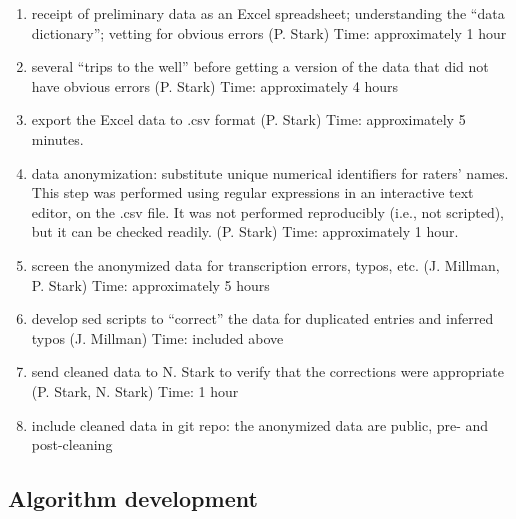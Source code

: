 \documentclass[]{article}
\begin{document}
  \begin{enumerate}
  \def\labelenumii{\roman{enumii}.}
  \itemsep1pt\parskip0pt
  \item
    receipt of preliminary data as an Excel spreadsheet; understanding
    the ``data dictionary''; vetting for obvious errors (P. Stark) Time:
    approximately 1 hour
  \item
    several ``trips to the well'' before getting a version of the data
    that did not have obvious errors (P. Stark) Time: approximately 4
    hours
  \item
    export the Excel data to .csv format (P. Stark) Time: approximately
    5 minutes.
  \item
    data anonymization: substitute unique numerical identifiers for
    raters' names. This step was performed using regular expressions in
    an interactive text editor, on the .csv file. It was not performed
    reproducibly (i.e., not scripted), but it can be checked readily.
    (P. Stark) Time: approximately 1 hour.
  \item
    screen the anonymized data for transcription errors, typos, etc. (J.
    Millman, P. Stark) Time: approximately 5 hours
  \item
    develop sed scripts to ``correct'' the data for duplicated entries
    and inferred typos (J. Millman) Time: included above
  \item
    send cleaned data to N. Stark to verify that the corrections were
    appropriate (P. Stark, N. Stark) Time: 1 hour
  \item
    include cleaned data in git repo: the anonymized data are public,
    pre- and post-cleaning
  \end{enumerate}
  
\subsection{Algorithm development}
\end{document}
